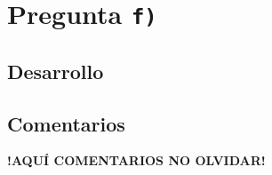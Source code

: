\section{Pregunta \texttt{f)}}\label{pregunta-f}


\subsection{Desarrollo}

\FloatBarrier
\subsection{Comentarios}


\textbf{!AQUÍ COMENTARIOS NO OLVIDAR!}

